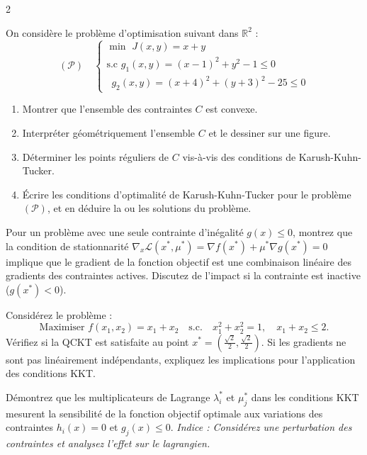 \begin{multicols}{2}
\begin{exercice}
	On considère le problème d'optimisation suivant dans $\mathbb{R}^{2}$ :
	\[
	(\mathcal{P}) \quad
	\begin{cases}
	\min \,\, J(x, y) = x + y \\
	\text{s.c} \,\, g_{1}(x, y) = (x - 1)^{2} + y^{2} - 1 \leqslant 0 \\
	\,\,\,g_{2}(x, y) = (x + 4)^{2} + (y + 3)^{2} - 25 \leqslant 0
	\end{cases}
	\]
	\begin{enumerate}[label=\arabic*.]
		\item Montrer que l'ensemble des contraintes $C$ est convexe.
		\item Interpréter géométriquement l'ensemble $C$ et le dessiner sur une figure.
		\item Déterminer les points réguliers de $C$ vis-à-vis des conditions de Karush-Kuhn-Tucker.
		\item Écrire les conditions d'optimalité de Karush-Kuhn-Tucker pour le problème $(\mathcal{P})$, et en déduire la ou les solutions du problème.
	\end{enumerate}
\end{exercice}

\begin{exercice}
	Pour un problème avec une seule contrainte d'inégalité \( g(x) \leq 0 \), montrez que la condition de stationnarité \( \nabla_x \mathcal{L}(x^*, \mu^*) = \nabla f(x^*) + \mu^* \nabla g(x^*) = 0 \) implique que le gradient de la fonction objectif est une combinaison linéaire des gradients des contraintes actives. Discutez de l'impact si la contrainte est inactive (\( g(x^*) < 0 \)).
\end{exercice}

\begin{exercice}
	Considérez le problème :
	\[
	\text{Maximiser } f(x_1, x_2) = x_1 + x_2 \quad \text{s.c.} \quad x_1^2 + x_2^2 = 1, \quad x_1 + x_2 \leq 2.
	\]
	Vérifiez si la QCKT est satisfaite au point \( x^* = \left( \frac{\sqrt{2}}{2}, \frac{\sqrt{2}}{2} \right) \). Si les gradients ne sont pas linéairement indépendants, expliquez les implications pour l'application des conditions KKT.
\end{exercice}

\begin{exercice}
	Démontrez que les multiplicateurs de Lagrange \( \lambda_i^* \) et \( \mu_j^* \) dans les conditions KKT mesurent la sensibilité de la fonction objectif optimale aux variations des contraintes \( h_i(x) = 0 \) et \( g_j(x) \leq 0 \). \textit{Indice : Considérez une perturbation des contraintes et analysez l'effet sur le lagrangien.}
\end{exercice}


\end{multicols}
